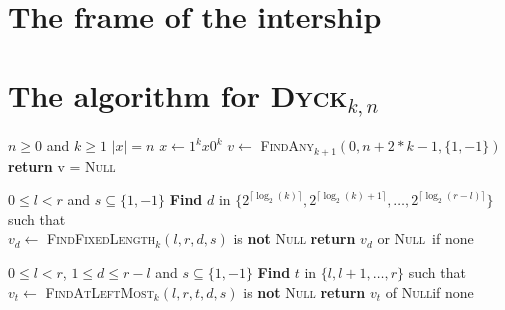 \documentclass[11pt,a4paper]{article}
\newcommand{\Dyck}[1]{\textsc{Dyck$_{#1}$}}
\newcommand{\FA}[1]{\textsc{FindAny$_{#1}$}}
\newcommand{\FFL}[1]{\textsc{FindFixedLength$_{#1}$}}
\newcommand{\FALM}[1]{\textsc{FindAtLeftMost$_{#1}$}}
\newcommand{\Null}{\textsc{Null}}
\theoremstyle{definition}
\theoremstyle{plain}
\theoremstyle{definition}
\begin{document}
\begin{appendix}

    \section*{The frame of the intership}

    \section{The algorithm for \Dyck{k, n}}

    \begin{algorithm}
        \caption{\Dyck{k,n}}\label{alg:dyck_kn}
        \begin{algorithmic}
            \Require $n \geq 0$ and $k \geq 1$
            \Ensure $|x| = n $
            \State $x \gets 1^kx0^k$
            \State $v \gets$ \FA{k+1}$(0, n+2*k-1, \{1,-1\})$
            \State \textbf{return} v = \Null
        \end{algorithmic}
    \end{algorithm}

    \begin{algorithm}
        \caption{\FA{k}$(l,r,s)$}\label{alg:fa_k}
        \begin{algorithmic}
            \Require $0 \leq l < r$ and $s \subseteq \{1,-1\}$
            \State \textbf{Find} $d$ in $\{2^{\lceil \log_2(k)\rceil }, 2^{\lceil \log_2(k)+1\rceil },\ldots,2^{\lceil \log_2(r-l)\rceil }\}$
            such that \\
            \hspace*{1cm} $v_d \gets $ \FFL{k}$(l,r,d,s)$ is \textbf{not} \Null
            \State \textbf{return} $v_d$ or \Null \ if none
        \end{algorithmic}
    \end{algorithm}

    \begin{algorithm}
        \caption{\FFL{k}$(l,r,d,s)$}\label{alg:ffl_k}
        \begin{algorithmic}
            \Require $0 \leq l < r$, $1\leq d \leq r-l$ and $s \subseteq \{1,-1\}$
            \State \textbf{Find} $t$ in $\{l, l+1, \dots, r\}$ such that \\
            \hspace*{1cm} $v_t \gets$ \FALM{k}$(l,r,t,d,s)$ is \textbf{not} \Null
            \State \textbf{return} $v_t$ of \Null if none
        \end{algorithmic}
    \end{algorithm}


\end{appendix}
\end{document}
